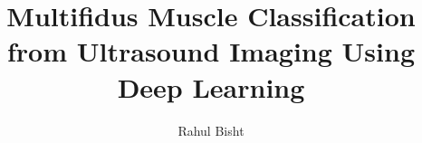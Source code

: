 \documentclass[modernstyle,12pt]{thesis}
\title{Multifidus Muscle Classification from Ultrasound Imaging Using Deep Learning }
\author{Rahul Bisht}{}
\begin{document}










\nocite{*}


% 
% 
\end{document}
